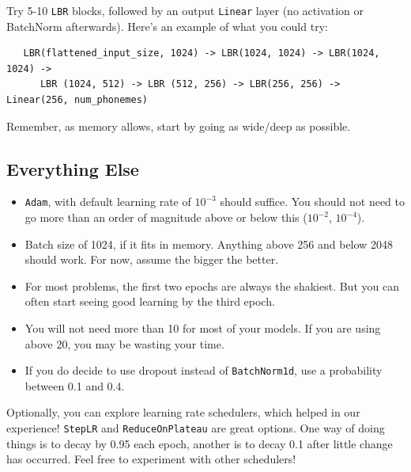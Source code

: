 \documentclass{article}
\newcommand{\ttt}[1]{\texttt{#1}}
\begin{document}
\begin{appendices}
Try 5-10 \ttt{LBR} blocks, followed by an output \ttt{Linear} layer (no activation or BatchNorm afterwards). Here's an example of what you could try:
\begin{verbatim}
   LBR(flattened_input_size, 1024) -> LBR(1024, 1024) -> LBR(1024, 1024) ->
      LBR (1024, 512) -> LBR (512, 256) -> LBR(256, 256) -> Linear(256, num_phonemes) 
\end{verbatim}

Remember, as memory allows, start by going as wide/deep as possible.

\subsection{Everything Else}
\begin{itemize}
    \item \ttt{Adam}, with default learning rate of $10^{-3}$ should suffice. You should not need to go more than an order of magnitude above or below this ($10^{-2}$, $10^{-4}$).
    \item Batch size of 1024, if it fits in memory. Anything above 256 and below 2048 should work. For now, assume the bigger the better.
    \item For most problems, the first two epochs are always the shakiest. But you can often start seeing good learning by the third epoch. 
    \item You will not need more than 10 for most of your models. If you are using above 20, you may be wasting your time.
    \item If you do decide to use dropout instead of \ttt{BatchNorm1d}, use a probability between 0.1 and 0.4.
\end{itemize}

Optionally, you can explore learning rate schedulers, which helped in our experience! \ttt{StepLR} and \ttt{ReduceOnPlateau} are great options. One way of doing things is to decay by 0.95 each epoch, another is to decay 0.1 after little change has occurred. Feel free to experiment with other schedulers!
\end{appendices}
\end{document}

